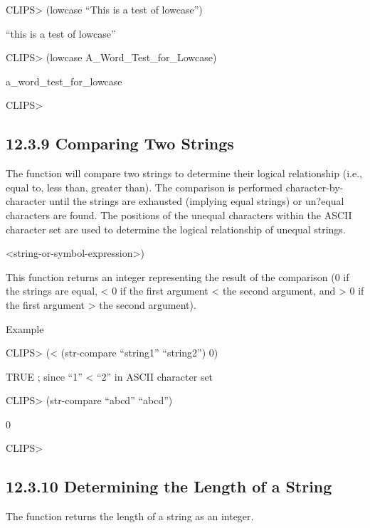\documentclass[letterpaper,10pt,english]{sphinxmanual}
\begin{document}
CLIPS\textgreater{} (lowcase “This is a test of lowcase”)

“this is a test of lowcase”

CLIPS\textgreater{} (lowcase A\_Word\_Test\_for\_Lowcase)

a\_word\_test\_for\_lowcase

CLIPS\textgreater{}


\subsection{12.3.9 Comparing Two Strings}
\label{\detokenize{actions:comparing-two-strings}}
The  function will compare two strings to determine their
logical relationship (i.e., equal to, less than, greater than). The
comparison is performed character-by-character until the strings are
exhausted (implying equal strings) or un?equal characters are found. The
positions of the unequal characters within the ASCII character set are
used to determine the logical relationship of unequal strings.


\begin{sphinxVerbatim}[commandchars=\\\{\}]
 
\end{sphinxVerbatim}

\textless{}string-or-symbol-expression\textgreater{})

This function returns an integer representing the result of the
comparison (0 if the strings are equal, \textless{} 0 if the first argument \textless{} the
second argument, and \textgreater{} 0 if the first argument \textgreater{} the second argument).

Example

CLIPS\textgreater{} (\textless{} (str-compare “string1” “string2”) 0)

TRUE ; since “1” \textless{} “2” in ASCII character set

CLIPS\textgreater{} (str-compare “abcd” “abcd”)

0

CLIPS\textgreater{}


\subsection{12.3.10 Determining the Length of a String}
\label{\detokenize{actions:determining-the-length-of-a-string}}
The  function returns the length of a string as an
integer.
\end{document}

